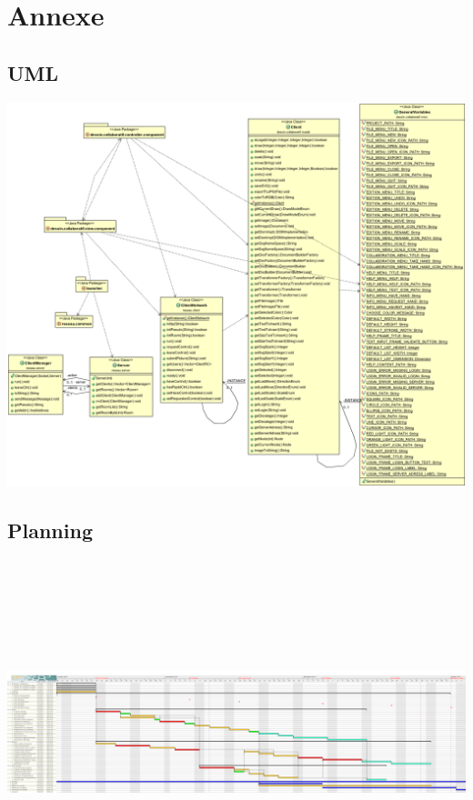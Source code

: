 \documentclass[a4paper,11pt]{article}
\begin{document}
\section{Annexe}
\subsection{UML}
\includegraphics[scale=0.35]{uml.png}
\clearpage
\subsection{Planning}
\includegraphics[width=17cm, height=10cm]{Dessin_collaboratif_-_Planning.png}
\clearpage
\end{document}
